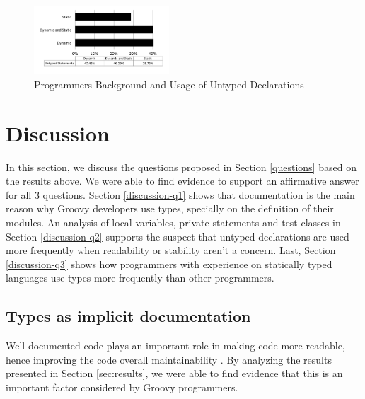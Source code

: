 \documentclass[preprint]{sigplanconf}
\begin{document}
\begin{figure}[ht]
\centering \includegraphics[width=0.45\textwidth]{images/untyped_background} 
\caption{Programmers Background and Usage of Untyped Declarations}
\label{fig:untyped_background} 
\end{figure}


















%
%
\section{Discussion\label{sec:Discussion}}
In this section, we discuss the questions proposed in Section \ref{questions} based on the results above.
We were able to find evidence to support an affirmative answer for all 3 questions.
Section \ref{discussion-q1} shows that documentation is the main reason why Groovy developers use types, specially on the definition of their modules.
An analysis of local variables, private statements and test classes in Section \ref{discussion-q2} supports the suspect that untyped declarations are used more frequently when readability or stability aren't a concern. 
Last, Section \ref{discussion-q3} shows how programmers with experience on statically typed languages use types more frequently than other programmers.

\subsection{Types as implicit documentation\label{discussion-q1}}
Well documented code plays an important role in making code more readable, hence improving the code overall maintainability \cite{Iso2004}.
By analyzing the results presented in Section \ref{sec:results}, we were able to find evidence that this is an important factor considered by Groovy programmers.
\end{document}
